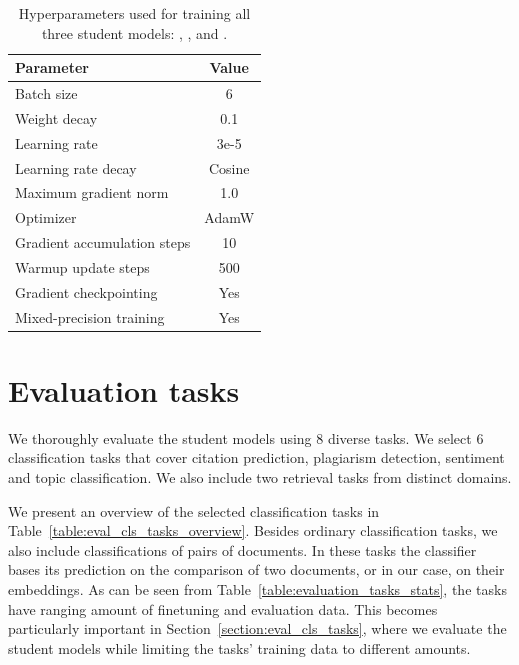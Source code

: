 \begin{table}
  \centering
  \footnotesize

  \begin{tabular}{l c}
    \toprule
    Parameter & Value \\
    \midrule
    Batch size & 6 \\
    Weight decay & 0.1 \\
    Learning rate & 3e-5 \\
    Learning rate decay & Cosine \\
    Maximum gradient norm & 1.0 \\
    Optimizer & AdamW \\
    Gradient accumulation steps & 10 \\
    Warmup update steps & 500\\
    Gradient checkpointing & Yes \\
    Mixed-precision training & Yes \\
    \bottomrule
  \end{tabular}

  \caption{Hyperparameters used for training all three student models:
  {\CosineStudent}, {\MSEStudent}, and {\OnlyMSEStudent}.}

  \label{table:final_student_train_params}

\end{table}

\section{Evaluation tasks}

We thoroughly evaluate the student models using 8 diverse tasks. We
select 6 classification tasks that cover citation prediction, plagiarism
detection, sentiment and topic classification. We also include two retrieval
tasks from distinct domains.

We present an overview of the selected classification tasks in
Table~\ref{table:eval_cls_tasks_overview}. Besides ordinary classification
tasks, we also include classifications of pairs of documents. In these tasks
the classifier bases its prediction on the comparison of two documents, or in
our case, on their embeddings. As can be seen from
Table~\ref{table:evaluation_tasks_stats}, the tasks have ranging amount of
finetuning and evaluation data. This becomes particularly important in
Section~\ref{section:eval_cls_tasks}, where we evaluate the student models
while limiting the tasks' training data to different amounts.

